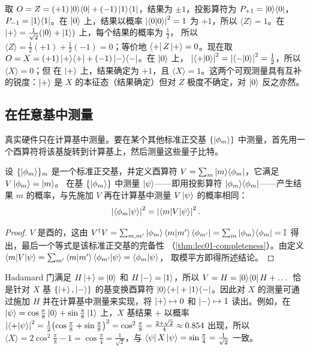 \begin{example}\label{exa:lec01-measZX}
取 $O=Z=(+1)\ket{0}\!\bra{0}+(-1)\ket{1}\!\bra{1}$，结果为 $\pm1$，投影算符为
$P_{+1}=\ket{0}\!\bra{0}$，$P_{-1}=\ket{1}\!\bra{1}$。在 $\ket{0}$ 上，结果以概率
$\left\lvert \braket{0|0} \right\rvert^{2}=1$ 为 $+1$，所以 $\langle Z\rangle=1$。在
$\ket{+}=\tfrac{1}{\sqrt2}(\ket{0}+\ket{1})$ 上，每个结果的概率为 $\tfrac12$，
所以 $\langle Z\rangle=\tfrac12(+1)+\tfrac12(-1)=0$；等价地
$\bra{+}Z\ket{+}=0$。现在取 $O=X=(+1)\ket{+}\!\bra{+}+(-1)\ket{-}\!\bra{-}$。在 $\ket{0}$ 上，
$\left\lvert \braket{+|0} \right\rvert^{2}=\left\lvert \braket{-|0} \right\rvert^{2}=\tfrac12$，所以 $\langle X\rangle=0$；但
在 $\ket{+}$ 上，结果确定为 $+1$，且 $\langle X\rangle=1$。这两个可观测量具有互补的锐度：$\ket{+}$ 是 $X$ 的本征态（结果确定）但对 $Z$ 极度不确定，对 $\ket{0}$ 反之亦然。
\end{example}

\subsection{在任意基中测量}

真实硬件只在计算基中测量。要在某个其他标准正交基 $\{\ket{\phi_{m}}\}$ 中测量，首先用一个酉算符将该基旋转到计算基上，然后测量这些量子比特。

\begin{proposition}[测量前的基变换]\label{prop:lec01-basischange}
设 $\{\ket{\phi_{m}}\}_{m}$ 是一个标准正交基，并定义酉算符
$V=\sum_{m}\ket{m}\!\bra{\phi_{m}}$，它满足 $V\ket{\phi_{m}}=\ket{m}$。
在基 $\{\ket{\phi_{m}}\}$ 中测量 $\ket{\psi}$——即用投影算符
$\ket{\phi_{m}}\!\bra{\phi_{m}}$——产生结果 $m$ 的概率，与先施加
$V$ 再在计算基中测量 $V\ket{\psi}$ 的概率相同：
\[
  \left\lvert \braket{\phi_{m}|\psi} \right\rvert^{2}=\left\lvert \braket{m|V|\psi} \right\rvert^{2}.
\]
\end{proposition}

\begin{proof}
$V$ 是酉的，这由
$V^{\dagger} V=\sum_{m,m'}\ket{\phi_{m}}\braket{m|m'}\bra{\phi_{m'}}=\sum_{m}\ket{\phi_{m}}\!\bra{\phi_{m}}=\mathbb{I}$
得出，最后一个等式是该标准正交基的完备性
（\cref{thm:lec01-completeness}）。由定义
$\braket{m|V|\psi}=\sum_{m'}\braket{m|m'}\braket{\phi_{m'}|\psi}=\braket{\phi_{m}|\psi}$，
取模平方即得所述结论。
\end{proof}

\begin{example}[借助 $H$ 在 $X$ 基中测量]\label{exa:lec01-xbasis}
Hadamard 门满足 $H\ket{+}=\ket{0}$ 和 $H\ket{-}=\ket{1}$，所以
$V=H=\ket{0}\!\bra{0}H+\dots$ 恰是针对 $X$ 基 $\{\ket{+},\ket{-}\}$ 的基变换酉算符
$\ket{0}\!\bra{+}+\ket{1}\!\bra{-}$。因此对 $X$ 的测量可通过施加 $H$ 并在计算基中测量来实现，将 $\ket{+}\mapsto0$ 和 $\ket{-}\mapsto1$ 读出。例如，在
$\ket{\psi}=\cos\tfrac{\pi}{8}\ket{0}+\sin\tfrac{\pi}{8}\ket{1}$ 上，$X$ 基结果
$+$ 以概率
$\left\lvert \braket{+|\psi} \right\rvert^{2}=\tfrac12\bigl(\cos\tfrac{\pi}{8}+\sin\tfrac{\pi}{8}\bigr)^{2}
=\cos^{2}\tfrac{\pi}{8}=\tfrac{2+\sqrt2}{4}\approx0.854$ 出现，所以
$\langle X\rangle=2\cos^{2}\tfrac{\pi}{8}-1=\cos\tfrac{\pi}{4}=\tfrac{1}{\sqrt2}$，与
$\bra{\psi}X\ket{\psi}=\sin\tfrac{\pi}{4}=\tfrac{1}{\sqrt2}$ 一致。
\end{example}

